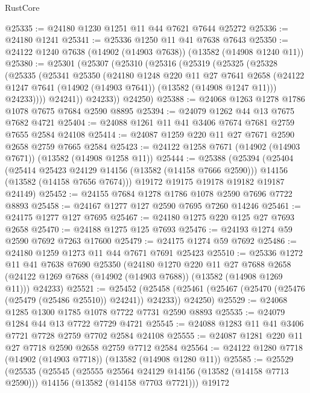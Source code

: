 \begin{lexlean}{RustCore}
\begin{coremodule}
@25335 := @24180 @1230 @1251 @11 @44 @7621 @7644 @25272
@25336 := @24180 @1241
@25341 := @25336 @1250 @11 @41 @7638 @7643
@25350 := @24122 @1240 @7638 (@14902 (@14903 @7638)) (@13582 (@14908 @1240 @11))
@25380 := @25301
    (@25307
      (@25310
        (@25316
          (@25319
            (@25325
              (@25328
                (@25335
                  (@25341
                    @25350
                    (@24180
                      @1248
                      @220
                      @11
                      @27
                      @7641
                      @2658
                      (@24122 @1247 @7641 (@14902 (@14903 @7641)) (@13582 (@14908 @1247 @11)))
                      @24233))))
              @24241))
          @24233))
      @24250)
@25388 := @24068 @1263 @1278 @1786 @1078 @7675 @7684 @2590 @8895
@25394 := @24079 @1262 @44 @13 @7675 @7682 @4721
@25404 := @24088 @1261 @11 @41 @3406 @7674 @7681 @2759 @7655 @2584 @24108
@25414 := @24087 @1259 @220 @11 @27 @7671 @2590 @2658 @2759 @7665 @2584
@25423 := @24122 @1258 @7671 (@14902 (@14903 @7671)) (@13582 (@14908 @1258 @11))
@25444 := @25388
    (@25394
      (@25404
        (@25414 @25423 @24129 @14156 (@13582 (@14158 @7666 @2590)))
        @14156
        (@13582 (@14158 @7656 @7674)))
      @19172
      @19175
      @19178
      @19182
      @19187
      @24149)
@25452 := @24155 @7684 @1278 @1786 @1078 @2590 @7696 @7722 @8893
@25458 := @24167 @1277 @127 @2590 @7695 @7260 @14246
@25461 := @24175 @1277 @127 @7695
@25467 := @24180 @1275 @220 @125 @27 @7693 @2658
@25470 := @24188 @1275 @125 @7693
@25476 := @24193 @1274 @59 @2590 @7692 @7263 @17600
@25479 := @24175 @1274 @59 @7692
@25486 := @24180 @1259 @1273 @11 @44 @7671 @7691 @25423
@25510 := @25336
    @1272
    @11
    @41
    @7638
    @7690
    @25350
    (@24180
      @1270
      @220
      @11
      @27
      @7688
      @2658
      (@24122 @1269 @7688 (@14902 (@14903 @7688)) (@13582 (@14908 @1269 @11)))
      @24233)
@25521 := @25452
    (@25458 (@25461 (@25467 (@25470 (@25476 (@25479 (@25486 @25510)) @24241)) @24233)) @24250)
@25529 := @24068 @1285 @1300 @1785 @1078 @7722 @7731 @2590 @8893
@25535 := @24079 @1284 @44 @13 @7722 @7729 @4721
@25545 := @24088 @1283 @11 @41 @3406 @7721 @7728 @2759 @7702 @2584 @24108
@25555 := @24087 @1281 @220 @11 @27 @7718 @2590 @2658 @2759 @7712 @2584
@25564 := @24122 @1280 @7718 (@14902 (@14903 @7718)) (@13582 (@14908 @1280 @11))
@25585 := @25529
    (@25535
      (@25545
        (@25555 @25564 @24129 @14156 (@13582 (@14158 @7713 @2590)))
        @14156
        (@13582 (@14158 @7703 @7721)))
      @19172

\end{coremodule}
\end{lexlean}
